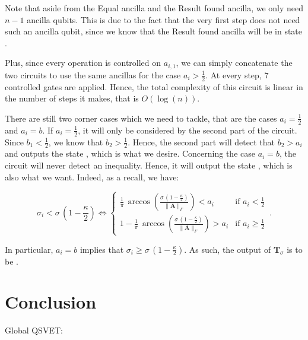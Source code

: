 \documentclass[11pt, a4paper]{article}
\begin{document}
                Note that aside from the Equal ancilla and the Result found ancilla, we only need \(n - 1\) ancilla qubits. This is due to the fact that the very first step does not need such an ancilla qubit, since we know that the Result found ancilla will be in state .
                
                Plus, since every operation is controlled on \(a_{i,1}\), we can simply concatenate the two circuits to use the same ancillas for the case \(a_i>\frac12\). At every step, \(7\) controlled gates are applied. Hence, the total complexity of this circuit is linear in the number of steps it makes, that is \(O(\log(n))\).
                
                There are still two corner cases which we need to tackle, that are the cases \(a_i=\frac12\) and \(a_i=b\). If \(a_i=\frac12\), it will only be considered by the second part of the circuit. Since \(b_1<\frac12\), we know that \(b_2>\frac12\). Hence, the second part will detect that \(b_2>a_i\) and outputs the state , which is what we desire. Concerning the case \(a_i=b\), the circuit will never detect an inequality. Hence, it will output the state , which is also what we want. Indeed, as a recall, we have:
                
                \[\sigma_i < \sigma\,\left(1 - \frac\kappa2\right)\iff\begin{cases}\frac1\pi\,\arccos\left(\frac{\sigma\,\left(1 - \frac\kappa2\right)}{\|\mathbf{A}\|_F}\right) < a_i&\text{if }a_i<\frac12\\1-\frac1\pi\,\arccos\left(\frac{\sigma\,\left(1 - \frac\kappa2\right)}{\|\mathbf{A}\|_F}\right) > a_i&\text{if }a_i\geqslant\frac12\end{cases}\,.\]
                
                In particular, \(a_i=b\) implies that \(\sigma_i \geqslant \sigma\,\left(1 - \frac\kappa2\right)\). As such, the output of \(\mathbf{T}_\sigma\) is to be .
                

    \section{Conclusion}
        Global QSVET:
        
\end{document}
